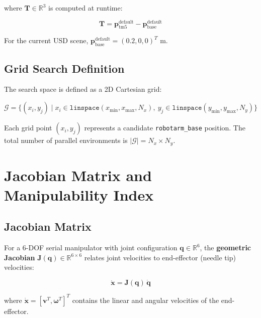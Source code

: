 \documentclass[a4paper,11pt]{article}
\begin{document}
where $\mathbf{T} \in \mathbb{R}^3$ is computed at runtime:

\begin{equation}
    \mathbf{T} = \mathbf{p}_{\text{tm5}}^{\text{default}} - \mathbf{p}_{\text{base}}^{\text{default}}
\end{equation}

For the current USD scene, $\mathbf{p}_{\text{base}}^{\text{default}} = (0.2, 0, 0)^T$ m.

\subsection{Grid Search Definition}

The search space is defined as a 2D Cartesian grid:

\begin{equation}
    \mathcal{G} = \{(x_i, y_j) \mid x_i \in \mathtt{linspace}(x_{\min}, x_{\max}, N_x),\ y_j \in \mathtt{linspace}(y_{\min}, y_{\max}, N_y)\}
\end{equation}

Each grid point $(x_i, y_j)$ represents a candidate \texttt{robotarm\_base} position. The total number of parallel environments is $|\mathcal{G}| = N_x \times N_y$.

\section{Jacobian Matrix and Manipulability Index}
\label{sec:manipulability}

\subsection{Jacobian Matrix}

For a 6-DOF serial manipulator with joint configuration $\mathbf{q} \in \mathbb{R}^6$, the \textbf{geometric Jacobian} $\mathbf{J}(\mathbf{q}) \in \mathbb{R}^{6 \times 6}$ relates joint velocities to end-effector (needle tip) velocities:

\begin{equation}
    \dot{\mathbf{x}} = \mathbf{J}(\mathbf{q})\, \dot{\mathbf{q}}
    \label{eq:jacobian}
\end{equation}

where $\dot{\mathbf{x}} = [\mathbf{v}^T, \boldsymbol{\omega}^T]^T$ contains the linear and angular velocities of the end-effector.
\end{document}
